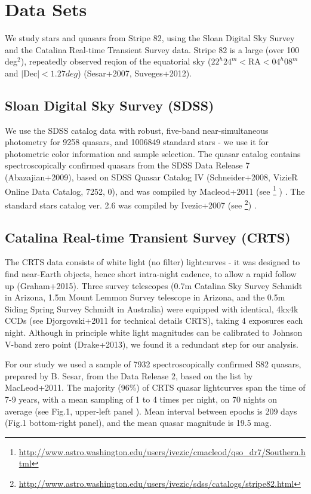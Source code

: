 \documentclass[fleqn,usenatbib]{mnras}  %
\begin{document}
\section{Data Sets}

We study stars and quasars from  Stripe 82, using the  Sloan Digital Sky Survey   and the Catalina Real-time Transient Survey data. Stripe 82 is a large (over 100 deg$^{2}$), repeatedly observed reqion of the equatorial sky ($22^{h} 24^{m} < \mathrm{RA} < 04^{h} 08^{m}$ and $\mathrm{| Dec |} < 1.27 deg$)    (Sesar+2007, Suveges+2012). 

\subsection{Sloan Digital Sky Survey (SDSS)}
We use the SDSS catalog data with  robust,  five-band near-simultaneous  photometry for  9258  quasars,  and 1006849 standard stars - we use it for photometric color information and sample selection.  The  quasar catalog contains spectroscopically confirmed quasars from the SDSS Data Release 7 (Abazajian+2009), based on SDSS Quasar  Catalog IV (Schneider+2008, VizieR Online Data Catalog, 7252, 0), and was compiled by Macleod+2011 (see \footnote{\url{http://www.astro.washington.edu/users/ivezic/cmacleod/qso_dr7/Southern.html}} ) .
The standard stars catalog ver. 2.6 was compiled by Ivezic+2007 (see \footnote{\url{http://www.astro.washington.edu/users/ivezic/sdss/catalogs/stripe82.html}}) .

\subsection{Catalina Real-time Transient Survey (CRTS)}
The CRTS data consists of white light (no filter) lightcurves  - it was designed to find near-Earth objects, hence short intra-night cadence, to allow a rapid follow up (Graham+2015).  Three survey telescopes (0.7m Catalina Sky Survey Schmidt in Arizona,  1.5m Mount  Lemmon Survey telescope in Arizona, and the 0.5m Siding Spring Survey Schmidt in Australia) were equipped with identical, 4kx4k CCDs (see Djorgovski+2011 for technical details CRTS), taking 4 exposures each night.
Although in principle white light magnitudes can be calibrated to Johnson V-band zero point (Drake+2013), we found it a redundant step for our analysis. 

For our study we used a sample of 7932 spectroscopically confirmed S82  quasars,   prepared by B. Sesar, from  the Data Release 2, based on the list by MacLeod+2011.  The majority (96\%) of  CRTS quasar lightcurves span the time of 7-9 years, with a mean sampling of 1 to 4 times per night,  on 70 nights on average (see Fig.1, upper-left panel ).  Mean interval between epochs is 209 days (Fig.1 bottom-right panel), and the mean quasar magnitude is 19.5 mag. 
\end{document}
